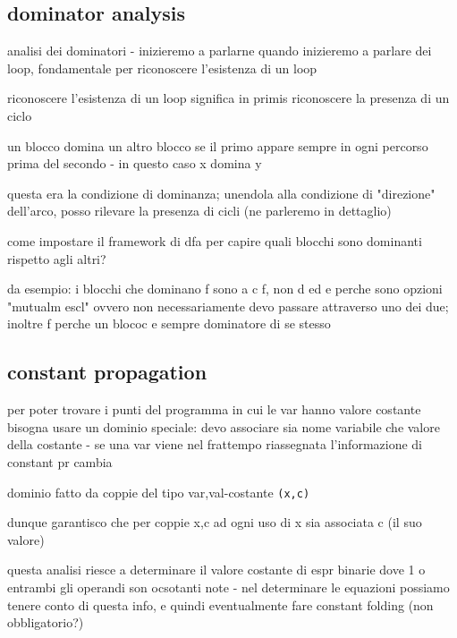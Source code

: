 \subsection{dominator analysis}

analisi dei dominatori - inizieremo a parlarne quando inizieremo a parlare dei loop, fondamentale per riconoscere l'esistenza di un loop

riconoscere l'esistenza di un loop significa in primis riconoscere la presenza di un ciclo

un blocco domina un altro blocco se il primo appare sempre in ogni percorso prima del secondo - in questo caso x domina y

questa era la condizione di dominanza; unendola alla condizione di "direzione" dell'arco, posso rilevare la presenza di cicli (ne parleremo in dettaglio)

come impostare il framework di dfa per capire quali blocchi sono dominanti rispetto agli altri?

da esempio: i blocchi che dominano f sono a c f, non d ed e perche sono opzioni "mutualm escl" ovvero non necessariamente devo passare attraverso uno dei due; inoltre f perche un blococ e sempre dominatore di se stesso

\subsection{constant propagation}

per poter trovare i punti del programma in cui le var hanno valore costante bisogna usare un dominio speciale: devo associare sia nome variabile che valore della costante - se una var viene nel frattempo riassegnata l'informazione di constant pr cambia

dominio fatto da coppie del tipo var,val-costante \lstinline|(x,c)|

dunque garantisco che per coppie x,c ad ogni uso di x sia associata c (il suo valore)

questa analisi riesce a determinare il valore costante di espr binarie dove 1 o entrambi gli operandi son ocsotanti note - nel determinare le equazioni possiamo tenere conto di questa info, e quindi eventualmente fare constant folding (non obbligatorio?)




